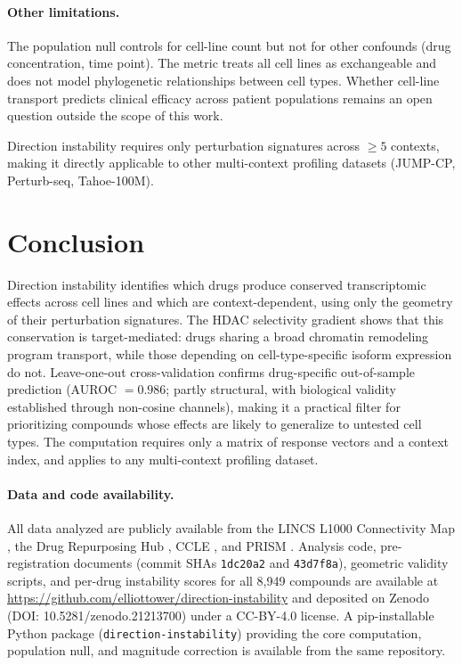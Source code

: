 \documentclass[11pt]{article}
\begin{document}
\paragraph{Other limitations.}
The population null controls for cell-line count but not for other
confounds (drug concentration, time point).  The metric treats all cell
lines as exchangeable and does not model phylogenetic relationships
between cell types.  Whether cell-line transport predicts clinical
efficacy across patient populations remains an open question outside the
scope of this work.

Direction instability requires only perturbation signatures across
$\geq5$ contexts, making it directly applicable to other multi-context
profiling datasets (JUMP-CP, Perturb-seq, Tahoe-100M).

\section{Conclusion}

Direction instability identifies which drugs produce conserved
transcriptomic effects across cell lines and which are
context-dependent, using only the geometry of their perturbation
signatures. The HDAC selectivity gradient shows that this conservation
is target-mediated: drugs sharing a broad chromatin remodeling program
transport, while those depending on cell-type-specific isoform
expression do not. Leave-one-out cross-validation confirms drug-specific
out-of-sample prediction (AUROC $= 0.986$; partly structural, with
biological validity established through non-cosine channels), making it
a practical filter for prioritizing compounds whose effects are likely
to generalize to untested cell types. The computation requires only a
matrix of response vectors and a context index, and applies to any
multi-context profiling dataset.

\paragraph{Data and code availability.} All data analyzed are publicly
available from the LINCS L1000 Connectivity Map
\citep{subramanian2017next}, the Drug Repurposing Hub
\citep{corsello2017drug}, CCLE \citep{barretina2012cancer}, and PRISM
\citep{corsello2020discovering}.  Analysis code, pre-registration
documents (commit SHAs \texttt{1dc20a2} and \texttt{43d7f8a}),
geometric validity scripts, and per-drug instability scores for all
8{,}949 compounds are available at
\url{https://github.com/elliottower/direction-instability} and
deposited on Zenodo (DOI: 10.5281/zenodo.21213700) under a CC-BY-4.0
license.  A pip-installable Python package
(\texttt{direction-instability}) providing the core computation,
population null, and magnitude correction is available from the same
repository.
\end{document}
